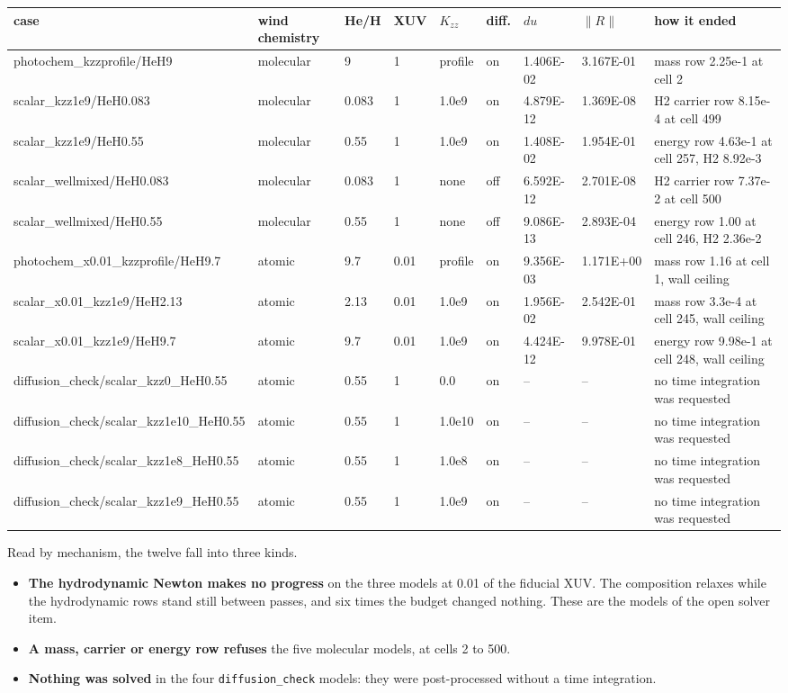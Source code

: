 \documentclass[11pt]{my_memo}
\begin{document}
\scriptsize\linespread{1.0}\selectfont\begin{longtable}{@{}l >{\raggedright\arraybackslash}p{1.4cm} l l l l l l >{\raggedright\arraybackslash}p{3.5cm}@{}}
\toprule
case & wind chemistry & He/H & XUV & $K_{zz}$ & diff. & $du$ & $\lVert R\rVert$ & how it ended\\
\midrule
\endhead
photochem\_kzzprofile/HeH9 & molecular & 9 & 1 & profile & on & 1.406E-02 & 3.167E-01 & mass row 2.25e-1 at cell 2\\
scalar\_kzz1e9/HeH0.083 & molecular & 0.083 & 1 & 1.0e9 & on & 4.879E-12 & 1.369E-08 & H2 carrier row 8.15e-4 at cell 499\\
scalar\_kzz1e9/HeH0.55 & molecular & 0.55 & 1 & 1.0e9 & on & 1.408E-02 & 1.954E-01 & energy row 4.63e-1 at cell 257, H2 8.92e-3\\
scalar\_wellmixed/HeH0.083 & molecular & 0.083 & 1 & none & off & 6.592E-12 & 2.701E-08 & H2 carrier row 7.37e-2 at cell 500\\
scalar\_wellmixed/HeH0.55 & molecular & 0.55 & 1 & none & off & 9.086E-13 & 2.893E-04 & energy row 1.00 at cell 246, H2 2.36e-2\\
photochem\_x0.01\_kzzprofile/HeH9.7 & atomic & 9.7 & 0.01 & profile & on & 9.356E-03 & 1.171E+00 & mass row 1.16 at cell 1, wall ceiling\\
scalar\_x0.01\_kzz1e9/HeH2.13 & atomic & 2.13 & 0.01 & 1.0e9 & on & 1.956E-02 & 2.542E-01 & mass row 3.3e-4 at cell 245, wall ceiling\\
scalar\_x0.01\_kzz1e9/HeH9.7 & atomic & 9.7 & 0.01 & 1.0e9 & on & 4.424E-12 & 9.978E-01 & energy row 9.98e-1 at cell 248, wall ceiling\\
diffusion\_check/scalar\_kzz0\_HeH0.55 & atomic & 0.55 & 1 & 0.0 & on & -- & -- & no time integration was requested\\
diffusion\_check/scalar\_kzz1e10\_HeH0.55 & atomic & 0.55 & 1 & 1.0e10 & on & -- & -- & no time integration was requested\\
diffusion\_check/scalar\_kzz1e8\_HeH0.55 & atomic & 0.55 & 1 & 1.0e8 & on & -- & -- & no time integration was requested\\
diffusion\_check/scalar\_kzz1e9\_HeH0.55 & atomic & 0.55 & 1 & 1.0e9 & on & -- & -- & no time integration was requested\\
\bottomrule
\end{longtable}\normalsize

\noindent
Read by mechanism, the twelve fall into three kinds.
\begin{itemize}
\item \textbf{The hydrodynamic Newton makes no progress} on the three models
      at 0.01 of the fiducial XUV. The composition relaxes while the
      hydrodynamic rows stand still between passes, and six times the budget
      changed nothing. These are the models of the open solver item.
\item \textbf{A mass, carrier or energy row refuses} the five molecular
      models, at cells 2 to 500.
\item \textbf{Nothing was solved} in the four \texttt{diffusion\_check} models:
      they were post-processed without a time integration.
\end{itemize}
\end{document}
